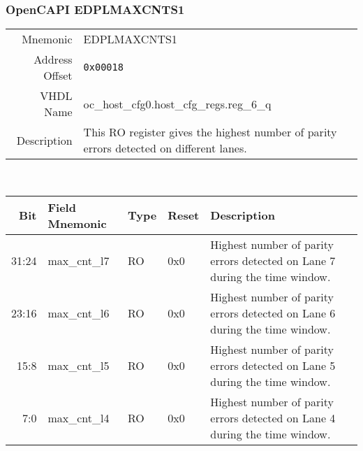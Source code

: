 \subsubsection{OpenCAPI EDPLMAXCNTS1}
\begin{tabular}{ r | p{350px} }
  Mnemonic       & EDPLMAXCNTS1            \\
  Address Offset & \texttt{0x00018}                         \\
  VHDL Name      & oc\_host\_cfg0.host\_cfg\_regs.reg\_6\_q \\ \hline

  Description &
  This RO register gives the highest number of parity errors detected on different lanes. \\

\end{tabular}
\\
\begin{tabularx}{\textwidth}{r|l|l|l|X}
  \hline
  Bit   & Field Mnemonic    & Type & Reset      & Description \\ \hline

  31:24 & max\_cnt\_l7  &  RO   & 0x0 & Highest number of parity errors detected on Lane 7 during the time window.\\
  23:16 & max\_cnt\_l6  &  RO   & 0x0 & Highest number of parity errors detected on Lane 6 during the time window.\\
  15:8  & max\_cnt\_l5  &  RO   & 0x0 & Highest number of parity errors detected on Lane 5 during the time window.\\
  7:0   & max\_cnt\_l4  &  RO   & 0x0 & Highest number of parity errors detected on Lane 4 during the time window.\\
\end{tabularx}


